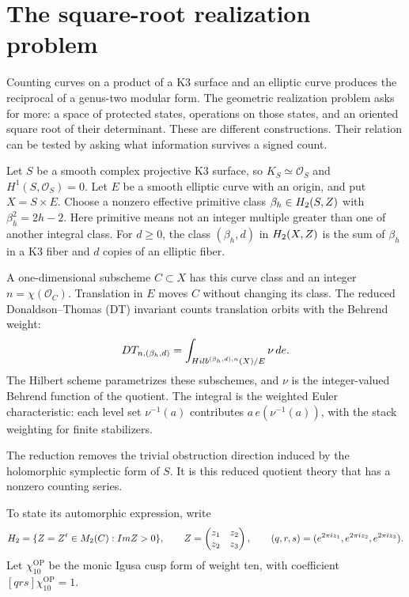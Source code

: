 \chapter*{The square-root realization problem}
\label{ch:frontispiece}

Counting curves on a product of a K3 surface and an elliptic curve
produces the reciprocal of a genus-two modular form. The geometric
realization problem asks for more: a space of protected states,
operations on those states, and an oriented square root of their
determinant. These are different constructions. Their relation can
be tested by asking what information survives a signed count.

Let \(S\) be a smooth complex projective K3 surface, so
\(K_S\simeq\mathcal O_S\) and \(H^1(S,\mathcal O_S)=0\).
Let \(E\) be a smooth elliptic curve with an origin, and put
\(X=S\times E\). Choose a nonzero effective primitive class
\(\beta_h\in H_2(S,Z)\) with \(\beta_h^2=2h-2\).
Here primitive means not an integer multiple greater than one of another
integral class. For \(d\geq0\), the class \((\beta_h,d)\) in
\(H_2(X,Z)\) is the sum of \(\beta_h\) in a K3 fiber and
\(d\) copies of an elliptic fiber.

A one-dimensional subscheme \(C\subset X\) has this curve class
and an integer \(n=\chi(\mathcal O_C)\). Translation in \(E\)
moves \(C\) without changing its class. The reduced
Donaldson--Thomas (DT) invariant counts translation orbits with the
Behrend weight:
\[
 DT_{n,(\beta_h,d)}=
 \int_{Hilb^{(\beta_h,d),n}(X)/E}\nu\,de.
\]
The Hilbert scheme parametrizes these subschemes, and \(\nu\) is
the integer-valued Behrend function of the quotient. The integral is
the weighted Euler characteristic: each level set \(\nu^{-1}(a)\)
contributes \(a\,e(\nu^{-1}(a))\), with the stack weighting for
finite stabilizers.

The reduction removes the trivial obstruction
direction induced by the holomorphic symplectic form of \(S\).
It is this reduced quotient theory that has a nonzero counting series.

To state its automorphic expression, write
\[
 H_2=\{Z=Z^t\in M_2(C):Im Z>0\},\qquad
 Z=\begin{pmatrix}z_1&z_2\\z_2&z_3\end{pmatrix},\qquad
 (q,r,s)=(e^{2\pi iz_1},e^{2\pi iz_2},e^{2\pi iz_3}).
\]
Let \(\chi_{10}^{\mathrm{OP}}\) be the monic Igusa cusp form of
weight ten, with coefficient \([qrs]\chi_{10}^{\mathrm{OP}}=1\).

